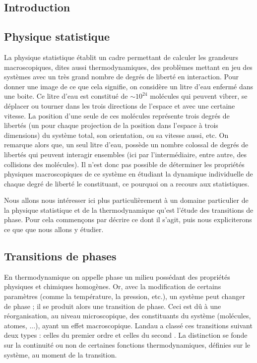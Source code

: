 \documentclass[10pt]{article}
\begin{document}
\pagebreak
\begin{multicols}{2}

\section{Introduction}

\subsection{Physique statistique}

La physique statistique établit un cadre permettant de calculer les grandeurs macroscopiques, dites aussi thermodynamiques, des problèmes mettant en jeu des systèmes avec un très grand nombre de degrés de liberté en interaction. Pour donner une image de ce que cela signifie, on considère un litre d'eau enfermé dans une boite. Ce litre d'eau est constitué de $\sim 10^{24}$ molécules qui peuvent vibrer, se déplacer ou tourner dans les trois directions de l'espace et avec une certaine vitesse. La position d'une seule de ces molécules représente trois degrés de libertés (un pour chaque projection de la position dans l'espace à trois dimensions) du système total, son orientation, ou sa vitesse aussi, etc. On remarque alors que, un seul litre d'eau, possède un nombre colossal de degrés de libertés qui peuvent interagir ensembles (ici par l'intermédiaire, entre autre, des collisions des molécules). Il n'est donc pas possible de déterminer les propriétés physiques macroscopiques de ce système en étudiant la dynamique individuelle de chaque degré de liberté le constituant, ce pourquoi on a recours aux statistiques. 

Nous allons nous intéresser ici plus particulièrement à un domaine particulier de la physique statistique et de la thermodynamique qu'est l'étude des transitions de phase. Pour cela commençons par décrire ce dont il s'agit, puis nous expliciterons ce que que nous allons y étudier. \\


\subsection{Transitions de phases}

En thermodynamique on appelle phase un milieu possédant des propriétés physiques et chimiques homogènes. Or, avec la modification de certains paramètres (comme la température, la pression, etc.), un système peut changer de phase ; il se produit alors une transition de phase. Ceci est dû à une réorganisation, au niveau microscopique, des constituants  du système (molécules, atomes, ...), ayant un effet macroscopique. Landau a classé ces transitions suivant deux types : celles du premier ordre et celles du second \cite{toledano1987landau}. La distinction se fonde sur la continuité ou non de certaines fonctions thermodynamiques, définies sur le système, au moment de la transition.
 

\end{multicols}
\end{document}
